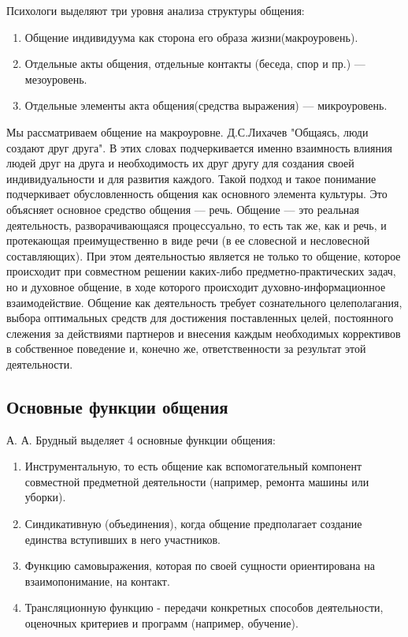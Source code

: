 Психологи выделяют три уровня анализа структуры общения:

\begin{enumerate}
    \item Общение индивидуума как сторона его образа жизни(макроуровень).
    \item Отдельные акты общения, отдельные контакты (беседа, спор и пр.) --- мезоуровень.
    \item Отдельные элементы акта общения(средства выражения) --- микроуровень.
\end{enumerate}

Мы рассматриваем общение на макроуровне.
Д.С.Лихачев "Общаясь, люди создают друг
друга".
В этих словах подчеркивается именно взаимность влияния людей друг на друга и необходимость их друг другу для создания своей индивидуальности и для развития каждого.
Такой подход и такое понимание подчеркивает обусловленность общения как основного элемента культуры.
Это объясняет основное средство общения --- речь.
Общение --- это реальная деятельность, разворачивающаяся процессуально, то есть так же, как и речь, и протекающая преимущественно в виде речи (в ее словесной и несловесной составляющих).
При этом деятельностью является не только то общение, которое происходит при совместном решении каких-либо предметно-практических задач, но и духовное общение, в ходе которого происходит духовно-информационное взаимодействие. Общение как деятельность требует сознательного целеполагания, выбора оптимальных средств для достижения поставленных целей, постоянного слежения за действиями партнеров и внесения каждым необходимых коррективов в собственное поведение и, конечно же, ответственности за результат этой деятельности.

\subsection*{Основные функции общения }
 

А. А. Брудный выделяет 4 основные функции общения:

\begin{enumerate}
    \item Инструментальную, то есть общение как вспомогательный компонент совместной предметной деятельности (например, ремонта машины или уборки).
    \item Синдикативную (объединения), когда общение предполагает создание единства вступивших в него участников.
    \item Функцию самовыражения, которая по своей сущности ориентирована на взаимопонимание, на контакт.
    \item Трансляционную функцию - передачи конкретных способов деятельности, оценочных критериев и программ (например, обучение).
\end{enumerate}

